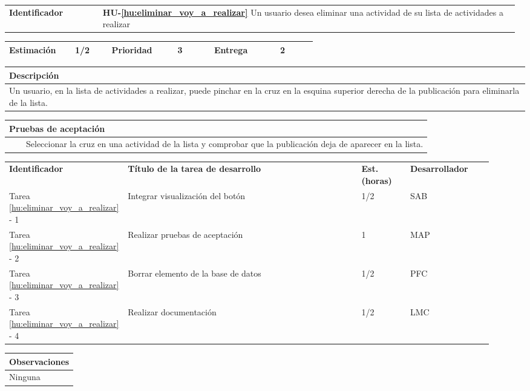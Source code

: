 \documentclass[11pt]{article}
\newcommand{\tabitem}{~~\llap{\textbullet}~~}
\begin{document}
\begin{longtable}{p{0.18\linewidth}|p{0.8\linewidth}}
  \rowcolor{LightCyan}
  \textbf{Identificador} & \textbf{HU-\ref{hu:eliminar_voy_a_realizar}} Un usuario desea eliminar una actividad de su lista de actividades a realizar \\  
\end{longtable}
\vspace{-0.8cm}
\begin{longtable}{p{0.18\linewidth}|p{0.1\linewidth}|p{0.18\linewidth}|p{0.1\linewidth}|p{0.18\linewidth}|p{0.1\linewidth}}
  \toprule
  \textbf{Estimación} & 1/2 & \textbf{Prioridad} & 3 & \textbf{Entrega} & 2 \\
  \bottomrule
\end{longtable}
\vspace{-0.8cm}
\begin{longtable}{p{1.028\linewidth}}
  \textbf{Descripción}\\
  \midrule Un usuario, en la lista de actividades a realizar, puede pinchar en la cruz en la esquina superior derecha de la publicación para eliminarla de la lista.\\
  \bottomrule
\end{longtable}
\vspace{-0.8cm}
\begin{longtable}{p{1.028\linewidth}}
  \textbf{Pruebas de aceptación}\\
  \midrule
  \tabitem Seleccionar la cruz en una actividad de la lista y comprobar que la publicación deja de aparecer en la lista.\\
\end{longtable}
\vspace{-0.8cm}
\begin{longtable}{p{0.18\linewidth}|p{0.48\linewidth}|p{0.1\linewidth}|p{0.17\linewidth}}
  \toprule
  \textbf{Identificador} & \textbf{Título de la tarea de desarrollo} & \textbf{Est. (horas)} & \textbf{Desarrollador} \\
  Tarea \ref{hu:eliminar_voy_a_realizar} - 1 & Integrar visualización del botón & 1/2 & SAB\\
  Tarea \ref{hu:eliminar_voy_a_realizar} - 2 & Realizar pruebas de aceptación& 1 & MAP\\
  Tarea \ref{hu:eliminar_voy_a_realizar} - 3 & Borrar elemento de la base de datos & 1/2 & PFC\\
  Tarea \ref{hu:eliminar_voy_a_realizar} - 4 & Realizar documentación & 1/2 & LMC \\
  \bottomrule
\end{longtable}
\vspace{-0.8cm}
\begin{longtable}{p{1.028\linewidth}}
  \textbf{Observaciones}\\
  \midrule
  Ninguna\\
  \bottomrule
\end{longtable}
\end{document}
